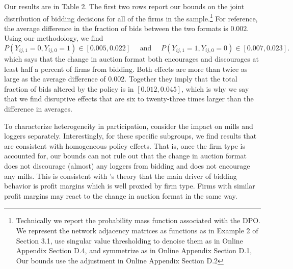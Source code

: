 \documentclass[12pt]{article}
\theoremstyle{definition}
\begin{document}
Our results are in Table 2. The first two rows report our bounds on the joint distribution of bidding decisions for all of the firms in the sample.\footnote{Technically we report the probability mass function associated with the DPO. We represent the network adjacency matrices as functions as in Example 2 of Section 3.1, use singular value thresholding to denoise them as in Online Appendix Section D.4, and symmetrize as in Online Appendix Section D.1, Our bounds use the adjustment in Online Appendix Section D.2}  For reference, the average difference in the fraction of bids between the two formats is $0.002$.  Using our methodology, we find $$P(Y_{ij,1} = 0, Y_{ij,0} = 1) \in [0.005, 0.022] \quad \text{ and } \quad P(Y_{ij,1} = 1, Y_{ij,0} = 0) \in [0.007, 0.023].$$
which says that the change in auction format both encourages and discourages at least half a percent of firms from bidding. Both effects are more than twice as large as the average difference of 0.002. Together they imply that the total fraction of bids altered by the policy is in $[0.012,0.045]$, which is why we say that we find disruptive effects that are six to twenty-three times larger than the difference in averages.     

To characterize heterogeneity in participation,  \cite{athey2011comparing} consider the impact on mills and loggers separately. Interestingly, for these specific subgroups, we find results that are consistent with homogeneous policy effects. That is, once the firm type is accounted for, our bounds can not rule out that the change in auction format does not discourage (almost) any loggers from bidding and does not encourage any mills. This is consistent with \cite{athey2011comparing}'s theory that the main driver of bidding behavior is profit margins which is well proxied by firm type. Firms with similar profit margins may react to the change in auction format in the same way.  
\end{document}
